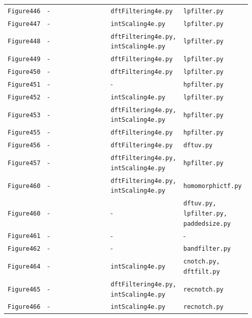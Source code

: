 \documentclass[10pt]{article}
\begin{document}
\begin{longtable}{p{0.11\linewidth} p{0.28\linewidth} p{0.28\linewidth} p{0.28\linewidth}}
\texttt{Figure446} & - & \texttt{dftFiltering4e.py} & \texttt{lpfilter.py} \\
\texttt{Figure447} & - & \texttt{intScaling4e.py} & \texttt{lpfilter.py} \\
\texttt{Figure448} & - & \texttt{dftFiltering4e.py, intScaling4e.py} & \texttt{lpfilter.py} \\
\texttt{Figure449} & - & \texttt{dftFiltering4e.py} & \texttt{lpfilter.py} \\
\texttt{Figure450} & - & \texttt{dftFiltering4e.py} & \texttt{lpfilter.py} \\
\texttt{Figure451} & - & - & \texttt{hpfilter.py} \\
\texttt{Figure452} & - & \texttt{intScaling4e.py} & \texttt{lpfilter.py} \\
\texttt{Figure453} & - & \texttt{dftFiltering4e.py, intScaling4e.py} & \texttt{hpfilter.py} \\
\texttt{Figure455} & - & \texttt{dftFiltering4e.py} & \texttt{hpfilter.py} \\
\texttt{Figure456} & - & \texttt{dftFiltering4e.py} & \texttt{dftuv.py} \\
\texttt{Figure457} & - & \texttt{dftFiltering4e.py, intScaling4e.py} & \texttt{hpfilter.py} \\
\texttt{Figure460} & - & \texttt{dftFiltering4e.py, intScaling4e.py} & \texttt{homomorphictf.py} \\
\texttt{Figure460} & - & - & \texttt{dftuv.py, lpfilter.py, paddedsize.py} \\
\texttt{Figure461} & - & - & - \\
\texttt{Figure462} & - & - & \texttt{bandfilter.py} \\
\texttt{Figure464} & - & \texttt{intScaling4e.py} & \texttt{cnotch.py, dftfilt.py} \\
\texttt{Figure465} & - & \texttt{dftFiltering4e.py, intScaling4e.py} & \texttt{recnotch.py} \\
\texttt{Figure466} & - & \texttt{intScaling4e.py} & \texttt{recnotch.py} \\
\end{longtable}
\end{document}
